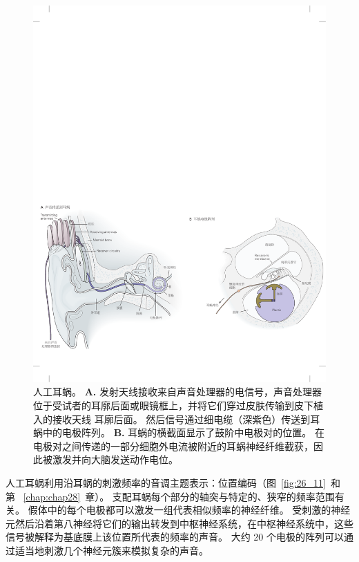 \begin{figure}[htbp]
	\centering
	\includegraphics[width=1.0\linewidth]{chap26/fig_26_19}
	\caption{人工耳蜗。
		\textbf{A.} 发射天线接收来自声音处理器的电信号，声音处理器位于受试者的耳廓后面或眼镜框上，并将它们穿过皮肤传输到皮下植入的接收天线 耳廓后面。
		然后信号通过细电缆（深紫色）传送到耳蜗中的电极阵列。
		\textbf{B.} 耳蜗的横截面显示了鼓阶中电极对的位置。
		在电极对之间传递的一部分细胞外电流被附近的耳蜗神经纤维截获，因此被激发并向大脑发送动作电位。}
	\label{fig:26_19}
\end{figure}


人工耳蜗利用沿耳蜗的刺激频率的音调主题表示：位置编码（图~\ref{fig:26_11}~和第~ \ref{chap:chap28}~章）。
支配耳蜗每个部分的轴突与特定的、狭窄的频率范围有关。
假体中的每个电极都可以激发一组代表相似频率的神经纤维。
受刺激的神经元然后沿着第八神经将它们的输出转发到中枢神经系统，在中枢神经系统中，这些信号被解释为基底膜上该位置所代表的频率的声音。
大约 20 个电极的阵列可以通过适当地刺激几个神经元簇来模拟复杂的声音。


